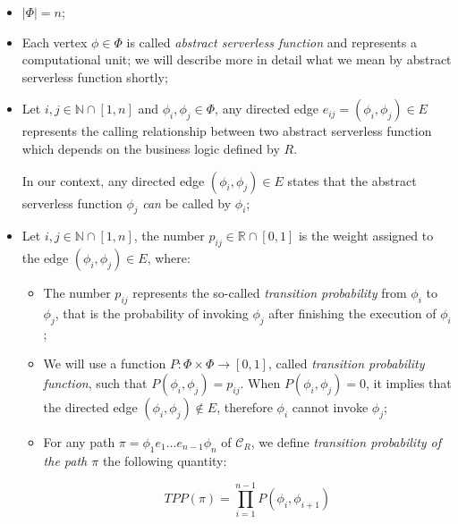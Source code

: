 \documentclass[10pt,a4paper]{report}
\newcommand*{\N}{\mathbb{N}}
\newcommand*{\R}{\mathbb{R}}
\theoremstyle{definition}
\begin{document}
\begin{itemize}
	\item $|\Phi| = n$;
	
	\item Each vertex $\phi \in \Phi$ is called \textit{abstract serverless function} and represents a computational unit; we will describe more in detail what we mean by abstract serverless function shortly;
	
	\item Let $i,j \in \N \cap \left[ 1, n \right]$ and $\phi_i, \phi_j \in \Phi$, any directed edge $e_{ij} = \left( \phi_i, \phi_j \right) \in E$ represents the calling relationship between two abstract serverless function which depends on the business logic defined by $R$. 
	
	In our context, any directed edge $\left( \phi_i, \phi_j \right) \in E$ states that the abstract serverless function $\phi_j$ \textit{can} be called by $\phi_i$;
	
	\item Let $i,j \in \N \cap \left[ 1, n \right]$, the number $p_{ij} \in \R \cap \left[ 0, 1 \right]$ is the weight assigned to the edge $\left(\phi_i, \phi_j \right) \in E$, where: 
	
	\begin{itemize}
		
		\item The number $p_{ij}$ represents the so-called \textit{transition probability} from $\phi_i$ to $\phi_j$, that is the probability of invoking $\phi_j$ after finishing the execution of $\phi_i$;
		
		\item We will use a function $P : \Phi \times \Phi \to \left[ 0, 1 \right]$, called \textit{transition probability function}, such that $P\left(\phi_i, \phi_j \right) = p_{ij}$. When $P\left(\phi_i, \phi_j \right) = 0$, it implies that the directed edge $\left( \phi_i, \phi_j \right) \notin E$, therefore $\phi_i$ cannot invoke $\phi_j$;
		
		\item For any path $\pi = \phi_1 e_1 \ldots e_{n-1} \phi_n$ of $\mathcal{C}_R$, we define \textit{transition probability of the path $\pi$} the following quantity:
		
		\begin{equation}
			TPP(\pi) = \prod_{i = 1}^{n-1} P\left(\phi_i, \phi_{i+1} \right)
		\end{equation}
		
	\end{itemize}
	

\end{itemize}
\end{document}
